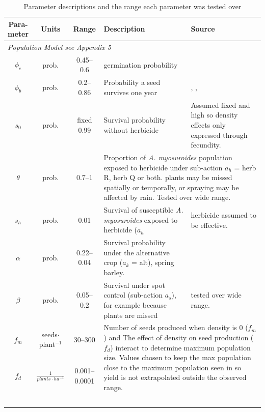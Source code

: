 \documentclass[12pt, a4paper]{article}
\begin{document}
\newpage 

\begin{longtable}{c c c p{5cm} p{4cm}}
	\caption{Parameter descriptions and the range each parameter was tested over}
	\label{tab:pars}
	\\
	\hline
	\makecell{\textbf{Para-}\\\textbf{meter}} & \textbf{Units} & \textbf{Range} & \textbf{Description} & \textbf{Source} \\
	\hline
	\endhead
	\multicolumn{5}{l}{\textit{Population Model see Appendix 5}}\\
	$\phi_e$ & prob. & 0.45--0.6 & germination probability & \citet{Colb2006} \\ 
	$\phi_b$ & prob. & 0.2--0.86 & Probability a seed survives one year & \citet{Colb2006}, \citet{Thom1997}, \citet{Cava1999}\\
	$s_0$ & prob. & fixed 0.99 & Survival probability without herbicide & Assumed fixed and high so density effects only expressed through fecundity.\\
	$\theta$ & prob. & 0.7--1 & \multicolumn{2}{l}{\parbox[t]{9cm}{Proportion of \textit{A. myosuroides} population exposed to herbicide under sub-action $a_h$ = herb R, herb Q or both. plants may be missed spatially or temporally, or spraying may be affected by rain. Tested over wide range.}} \\       
	$s_h$ & prob. & 0.01 & Survival of susceptible \textit{A. myosuroides} exposed to herbicide ($a_h$ & herbicide assumed to be effective.\\
	$\alpha$ & prob. & 0.22--0.04 & Survival probability under the alternative crop ($a_k$ = alt), spring barley. & \citet{Lutm2013}\\
	$\beta$ & prob. & 0.05--0.2 & Survival under spot control (sub-action $a_s$), for example because plants are missed & tested over wide range.\\
	$f_m$ & \makecell[t]{seeds$\cdot$\\plant$^{-1}$} & 30--300 & \multicolumn{2}{l}{\multirow{2}{9cm}{\parbox[t]{9cm}{Number of seeds produced when density is 0 ($f_m$) and The effect of density on seed production ($f_d$) interact to determine maximum population size. Values chosen to keep the max population close to the maximum population seen in \citet{Quee2011} so yield is not extrapolated outside the observed range.}}} \\
	$f_d$ & $\frac{1}{plants\cdot ha^{-1}}$ & 0.001--0.0001 &  \\\\\\\\\\\\

\end{longtable}
\end{document}

